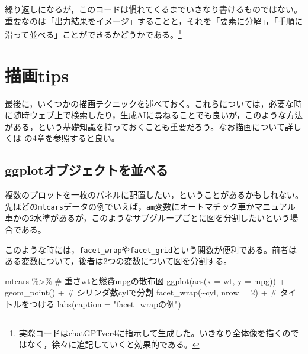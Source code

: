 \documentclass[
  a4paper,
]{ltjsbook}
\newenvironment{Shaded}{\begin{snugshade}}{\end{snugshade}}
\newcommand{\AttributeTok}[1]{\textcolor[rgb]{0.40,0.45,0.13}{#1}}
\newcommand{\CommentTok}[1]{\textcolor[rgb]{0.37,0.37,0.37}{#1}}
\newcommand{\DecValTok}[1]{\textcolor[rgb]{0.68,0.00,0.00}{#1}}
\newcommand{\FunctionTok}[1]{\textcolor[rgb]{0.28,0.35,0.67}{#1}}
\newcommand{\NormalTok}[1]{\textcolor[rgb]{0.00,0.23,0.31}{#1}}
\newcommand{\SpecialCharTok}[1]{\textcolor[rgb]{0.37,0.37,0.37}{#1}}
\newcommand{\StringTok}[1]{\textcolor[rgb]{0.13,0.47,0.30}{#1}}
\begin{document}
繰り返しになるが，このコードは慣れてくるまでいきなり書けるものではない。重要なのは「出力結果をイメージ」することと，それを「要素に分解」，「手順に沿って並べる」ことができるかどうかである。\footnote{実際コードはchatGPTver4に指示して生成した。いきなり全体像を描くのではなく，徐々に追記していくと効果的である。}

\section{描画tips}\label{ux63cfux753btips}

最後に，いくつかの描画テクニックを述べておく。これらについては，必要な時に随時ウェブ上で検索したり，生成AIに尋ねることでも良いが，このような方法がある，という基礎知識を持っておくことも重要だろう。なお描画について詳しくは\autocite{Kinosady2021}
の4章を参照すると良い。

\subsection{ggplotオブジェクトを並べる}\label{ggplotux30aaux30d6ux30b8ux30a7ux30afux30c8ux3092ux4e26ux3079ux308b}

複数のプロットを一枚のパネルに配置したい，ということがあるかもしれない。先ほどの\texttt{mtcars}データの例でいえば，\texttt{am}変数にオートマチック車かマニュアル車かの2水準があるが，このようなサブグループごとに図を分割したいという場合である。

このような時には，\texttt{facet\_wrap}や\texttt{facet\_grid}という関数が便利である。前者はある変数について，後者は2つの変数について図を分割する。

\begin{Shaded}
\begin{Highlighting}[]
\NormalTok{mtcars }\SpecialCharTok{\%\textgreater{}\%}
  \CommentTok{\# 重さwtと燃費mpgの散布図}
  \FunctionTok{ggplot}\NormalTok{(}\FunctionTok{aes}\NormalTok{(}\AttributeTok{x =}\NormalTok{ wt, }\AttributeTok{y =}\NormalTok{ mpg)) }\SpecialCharTok{+}
  \FunctionTok{geom\_point}\NormalTok{() }\SpecialCharTok{+}
  \CommentTok{\# シリンダ数cylで分割}
  \FunctionTok{facet\_wrap}\NormalTok{(}\SpecialCharTok{\textasciitilde{}}\NormalTok{cyl, }\AttributeTok{nrow =} \DecValTok{2}\NormalTok{) }\SpecialCharTok{+}
  \CommentTok{\# タイトルをつける}
  \FunctionTok{labs}\NormalTok{(}\AttributeTok{caption =} \StringTok{"facet\_wrapの例"}\NormalTok{)}
\end{Highlighting}
\end{Shaded}
\end{document}

